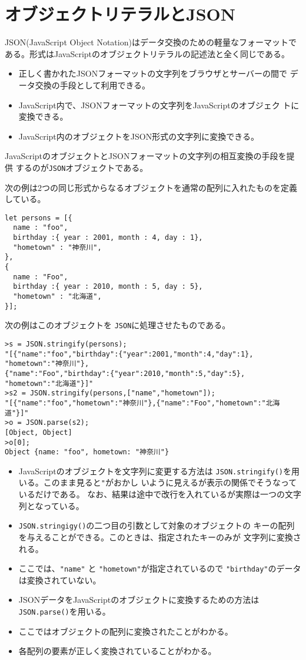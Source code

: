 \section{オブジェクトリテラルとJSON}
JSON(JavaScript Object Notation)はデータ交換のための軽量なフォーマットで
ある。形式はJavaScriptのオブジェクトリテラルの記述法と全く同じである。
\begin{itemize}
 \item 正しく書かれたJSONフォーマットの文字列をブラウザとサーバーの間で
       データ交換の手段として利用できる。
 \item JavaScript内で、JSONフォーマットの文字列をJavaScriptのオブジェク
       トに変換できる。
 \item JavaScript内のオブジェクトをJSON形式の文字列に変換できる。
\end{itemize}

JavaScriptのオブジェクトとJSONフォーマットの文字列の相互変換の手段を提供
するのが\texttt{JSON}オブジェクトである。

\begin{Exec}\label{JSONExec}\upshape
次の例は2つの同じ形式からなるオブジェクトを通常の配列に入れたものを定義
 している。
\begin{Verbatim}
let persons = [{
  name : "foo",
  birthday :{ year : 2001, month : 4, day : 1},
  "hometown" : "神奈川",
},
{
  name : "Foo",
  birthday :{ year : 2010, month : 5, day : 5},
  "hometown" : "北海道",
}];
\end{Verbatim}
次の例はこのオブジェクトを \texttt{JSON}に処理させたものである。
\begin{Verbatim}
>s = JSON.stringify(persons);
"[{"name":"foo","birthday":{"year":2001,"month":4,"day":1},
"hometown":"神奈川"},
{"name":"Foo","birthday":{"year":2010,"month":5,"day":5},
"hometown":"北海道"}]"
>s2 = JSON.stringify(persons,["name","hometown"]);
"[{"name":"foo","hometown":"神奈川"},{"name":"Foo","hometown":"北海道"}]"
>o = JSON.parse(s2);
[Object, Object]
>o[0];
Object {name: "foo", hometown: "神奈川"}
\end{Verbatim}
\begin{itemize}
 \item JavaScriptのオブジェクトを文字列に変更する方法は
       \texttt{JSON.stringify()}を用いる。このまま見ると\verb+"+がおかし
       いように見えるが表示の関係でそうなっているだけである。%
なお、結果は途中で改行を入れているが実際は一つの文字列となっている。
 \item \texttt{JSON.stringigy()}の二つ目の引数として対象のオブジェクトの
       キーの配列を与えることができる。このときは、指定されたキーのみが
       文字列に変換される。
 \item ここでは、\verb+"name"+ と \verb+"hometown"+が指定されているので
\verb+"birthday"+のデータは変換されていない。
 \item JSONデータをJavaScriptのオブジェクトに変換するための方法は
       \texttt{JSON.parse()}を用いる。
 \item ここではオブジェクトの配列に変換されたことがわかる。
 \item 各配列の要素が正しく変換されていることがわかる。
\end{itemize}
\end{Exec}

